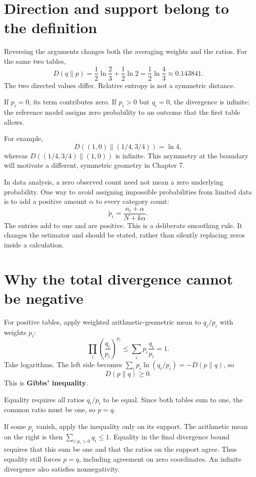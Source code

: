 \documentclass[11pt,oneside,openany]{book}
\theoremstyle{definition}
\theoremstyle{remark}
\numberwithin{equation}{chapter}
\begin{document}
\section{Direction and support belong to the definition}\label{ch06-direction-and-support-belong-to-the-definition}

Reversing the arguments changes both the averaging weights and the ratios. For the same two tables, \[D(q\|p)=\frac12\ln\frac23+\frac12\ln2
=\frac12\ln\frac43\approx0.143841.\] The two directed values differ. Relative entropy is not a symmetric distance.

If \(p_i=0\), its term contributes zero. If \(p_i>0\) but \(q_i=0\), the divergence is infinite: the reference model assigns zero probability to an outcome that the first table allows.

For example, \[D((1,0)\|(1/4,3/4))=\ln4,\] whereas \(D((1/4,3/4)\|(1,0))\) is infinite. This asymmetry at the boundary will motivate a different, symmetric geometry in Chapter 7.

In data analysis, a zero observed count need not mean a zero underlying probability. One way to avoid assigning impossible probabilities from limited data is to add a positive amount \(\alpha\) to every category count: \[\widetilde p_i=\frac{n_i+\alpha}{N+k\alpha}.\] The entries add to one and are positive. This is a deliberate smoothing rule. It changes the estimator and should be stated, rather than silently replacing zeros inside a calculation.

\section{Why the total divergence cannot be negative}\label{ch06-why-the-total-divergence-cannot-be-negative}

For positive tables, apply weighted arithmetic-geometric mean to \(q_i/p_i\) with weights \(p_i\): \[\prod_i\left(\frac{q_i}{p_i}\right)^{p_i}
\leq\sum_i p_i\frac{q_i}{p_i}=1.\] Take logarithms. The left side becomes \(\sum_i p_i\ln(q_i/p_i)=-D(p\|q)\), so \[\boxed{D(p\|q)\geq0.}\] This is \textbf{Gibbs' inequality}.

Equality requires all ratios \(q_i/p_i\) to be equal. Since both tables sum to one, the common ratio must be one, so \(p=q\).

If some \(p_i\) vanish, apply the inequality only on its support. The arithmetic mean on the right is then \(\sum_{i:p_i>0}q_i\leq1\). Equality in the final divergence bound requires that this sum be one and that the ratios on the support agree. Thus equality still forces \(p=q\), including agreement on zero coordinates. An infinite divergence also satisfies nonnegativity.
\end{document}
